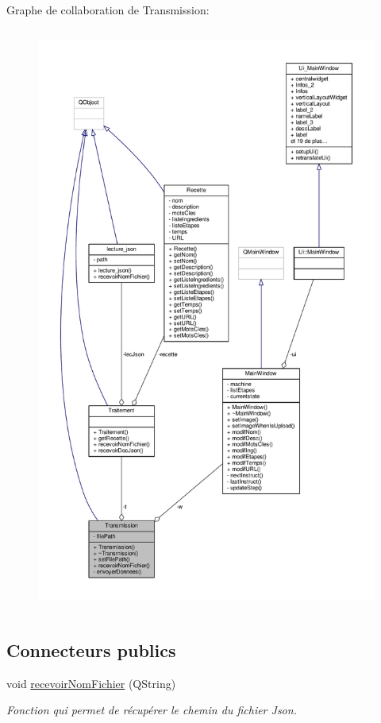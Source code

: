 Graphe de collaboration de Transmission\+:\nopagebreak
\begin{figure}[H]
\begin{center}
\leavevmode
\includegraphics[height=550pt]{classTransmission__coll__graph}
\end{center}
\end{figure}
\subsection*{Connecteurs publics}
\begin{DoxyCompactItemize}
\item 
void \hyperlink{classTransmission_aa442272a44f095192da5b0bf92a5bb06}{recevoir\+Nom\+Fichier} (Q\+String)
\begin{DoxyCompactList}\small\item\em Fonction qui permet de récupérer le chemin du fichier Json. \end{DoxyCompactList}\end{DoxyCompactItemize}
